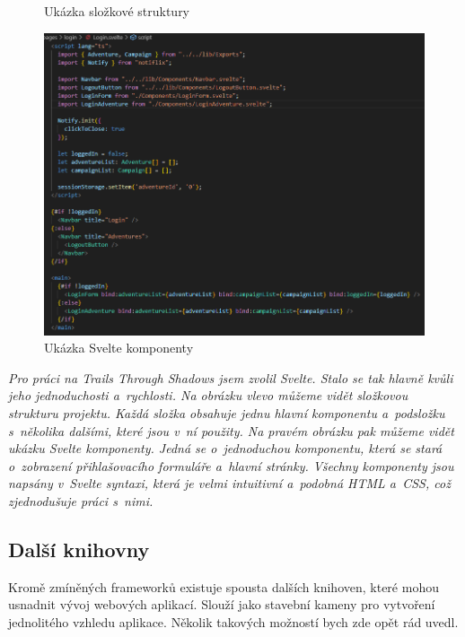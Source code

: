 \begin{figure}[H]
\begin{minipage}{0.25\textwidth}
    \caption{Ukázka složkové struktury}
    \label{fig:example7}
  \end{minipage}
    \begin{minipage}{0.75\textwidth}
    \centering
    \includegraphics[width=\textwidth]{resources/figures/example8.png}
    \caption{Ukázka Svelte komponenty}
    \label{fig:frameworks}
  \end{minipage}
\end{figure}

\textit{Pro práci na Trails Through Shadows jsem zvolil Svelte. Stalo se tak hlavně kvůli jeho jednoduchosti a~rychlosti. Na obrázku vlevo můžeme vidět složkovou strukturu projektu. Každá složka obsahuje jednu hlavní komponentu a~podsložku s~několika dalšími, které jsou v~ní použity. Na pravém obrázku pak můžeme vidět ukázku Svelte komponenty. Jedná se o~jednoduchou komponentu, která se stará o~zobrazení přihlašovacího formuláře a~hlavní stránky. Všechny komponenty jsou napsány v~Svelte syntaxi, která je velmi intuitivní a~podobná HTML a~CSS, což zjednodušuje práci s~nimi.}

\subsection{Další knihovny}
\label{sec:other-libraries}

Kromě zmíněných frameworků existuje spousta dalších knihoven, které mohou usnadnit vývoj webových aplikací. Slouží jako stavební kameny pro vytvoření jednolitého vzhledu aplikace. Několik takových možností bych zde opět rád uvedl.

